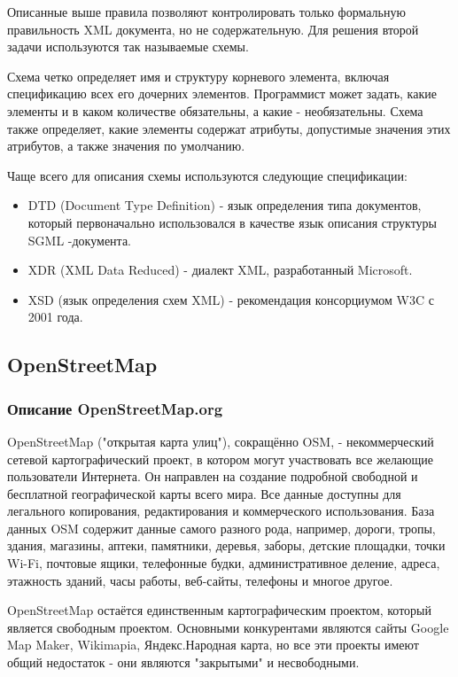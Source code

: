 \documentclass[12pt,a4paper,oneside]{article} %
\begin{document}
Описанные выше правила позволяют контролировать только формальную правильность XML документа, но не содержательную. Для решения второй задачи используются так называемые схемы.

Схема четко определяет имя и структуру корневого элемента, включая спецификацию всех его дочерних элементов. Программист может задать, какие элементы и в каком количестве обязательны, а какие - необязательны. Схема также определяет, какие элементы содержат атрибуты, допустимые значения этих атрибутов, а также значения по умолчанию.

Чаще всего для описания схемы используются следующие спецификации:
\begin{itemize}
\item	DTD (Document Type Definition) - язык определения типа документов, который первоначально использовался в качестве язык описания структуры SGML -документа.
\item	XDR (XML Data Reduced) - диалект XML, разработанный Microsoft.
\item	XSD (язык определения схем XML) - рекомендация консорциумом W3C с 2001 года.
\end{itemize}

\newpage
\subsection{OpenStreetMap}
\subsubsection{Описание OpenStreetMap.org}

OpenStreetMap ("открытая карта улиц"), сокращённо OSM, - некоммерческий сетевой картографический проект, в котором могут участвовать все желающие пользователи Интернета. Он направлен на создание подробной свободной и бесплатной географической карты всего мира. Все данные доступны для легального копирования, редактирования и коммерческого использования. База данных OSM содержит данные самого разного рода, например, дороги, тропы, здания, магазины, аптеки, памятники, деревья, заборы, детские площадки, точки Wi-Fi, почтовые ящики, телефонные будки, административное деление, адреса, этажность зданий, часы работы, веб-сайты, телефоны и многое другое.

OpenStreetMap остаётся единственным картографическим проектом, который является свободным проектом. Основными конкурентами являются сайты Google Map Maker, Wikimapia, Яндекс.Народная карта, но все эти проекты имеют общий недостаток - они являются "закрытыми" и несвободными.
\end{document}
